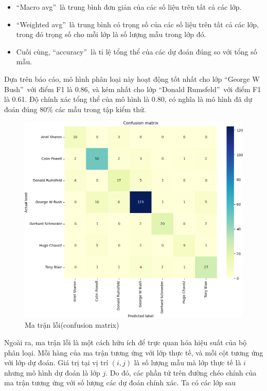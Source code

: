 \documentclass[12pt,a4paper,oneside]{report}
\numberwithin{equation}{section}
\begin{document}
\begin{itemize}
\item \textquotedblleft Macro avg\textquotedblright\ là trung bình đơn giản của các số liệu trên tất cả các lớp.
\item \textquotedblleft Weighted avg\textquotedblright\ là trung bình có trọng số của các số liệu trên tất cả các lớp, trong đó trọng số cho mỗi lớp là số lượng mẫu trong lớp đó.
\item Cuối cùng, \textquotedblleft accuracy\textquotedblright\ là tỉ lệ tổng thể của các dự đoán đúng so với tổng số mẫu.
\end{itemize}
Dựa trên báo cáo, mô hình phân loại này hoạt động tốt nhất cho lớp \textquotedblleft George W Bush\textquotedblright\ với điểm F1 là 0.86, và kém nhất cho lớp \textquotedblleft Donald Rumsfeld\textquotedblright\ với điểm F1 là 0.61. Độ chính xác tổng thể của mô hình là 0.80, có nghĩa là mô hình đã dự đoán đúng 80\% các mẫu trong tập kiểm thử.
\begin{figure}[htp]
	\hspace*{-2cm} 
	\includegraphics[scale=0.8]{heatmap.png}
	\caption{Ma trận lỗi(confusion matrix)}
	\label{fig:headmap}
\end{figure}

Ngoài ra, ma trận lỗi là một cách hữu ích để trực quan hóa hiệu suất của bộ phân loại. Mỗi hàng của ma trận tương ứng với lớp thực tế, và mỗi cột tương ứng với lớp dự đoán. Giá trị tại vị trí $(i, j)$ là số lượng mẫu mà lớp thực tế là $i$ nhưng mô hình dự đoán là lớp $j$. Do đó, các phần tử trên đường chéo chính của ma trận tương ứng với số lượng các dự đoán chính xác.
Ta có các lớp sau
\end{document}
